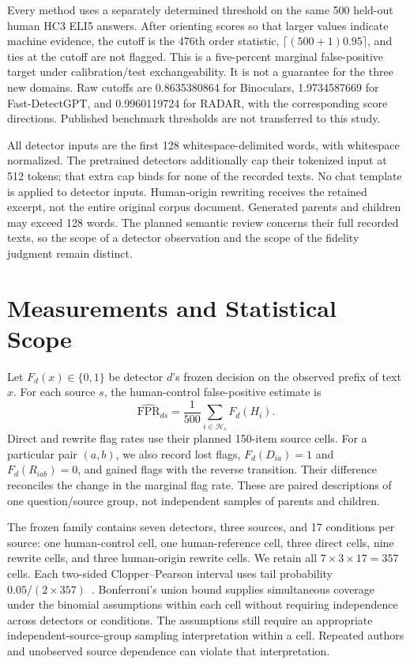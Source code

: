 Every method uses a separately determined threshold on the same 500 held-out human HC3 ELI5 answers. After orienting scores so that larger values indicate machine evidence, the cutoff is the 476th order statistic, $\lceil(500+1)0.95\rceil$, and ties at the cutoff are not flagged. This is a five-percent marginal false-positive target under calibration/test exchangeability. It is not a guarantee for the three new domains. Raw cutoffs are 0.8635380864 for Binoculars, 1.9734587669 for Fast-DetectGPT, and 0.9960119724 for RADAR, with the corresponding score directions. Published benchmark thresholds are not transferred to this study.

All detector inputs are the first 128 whitespace-delimited words, with whitespace normalized. The pretrained detectors additionally cap their tokenized input at 512 tokens; that extra cap binds for none of the recorded texts. No chat template is applied to detector inputs. Human-origin rewriting receives the retained excerpt, not the entire original corpus document. Generated parents and children may exceed 128 words. The planned semantic review concerns their full recorded texts, so the scope of a detector observation and the scope of the fidelity judgment remain distinct.

\section{Measurements and Statistical Scope}
Let $F_d(x)\in\{0,1\}$ be detector $d$'s frozen decision on the observed prefix of text $x$. For each source $s$, the human-control false-positive estimate is
\begin{equation}
\widehat{\mathrm{FPR}}_{ds}=\frac{1}{500}\sum_{i\in\mathcal H_s}F_d(H_i).
\end{equation}
Direct and rewrite flag rates use their planned 150-item source cells. For a particular pair $(a,b)$, we also record lost flags, $F_d(D_{ia})=1$ and $F_d(R_{iab})=0$, and gained flags with the reverse transition. Their difference reconciles the change in the marginal flag rate. These are paired descriptions of one question/source group, not independent samples of parents and children.

The frozen family contains seven detectors, three sources, and 17 conditions per source: one human-control cell, one human-reference cell, three direct cells, nine rewrite cells, and three human-origin rewrite cells. We retain all $7\times3\times17=357$ cells. Each two-sided Clopper--Pearson interval uses tail probability $0.05/(2\times357)$~\cite{clopper1934}. Bonferroni's union bound supplies simultaneous coverage under the binomial assumptions within each cell without requiring independence across detectors or conditions. The assumptions still require an appropriate independent-source-group sampling interpretation within a cell. Repeated authors and unobserved source dependence can violate that interpretation.

